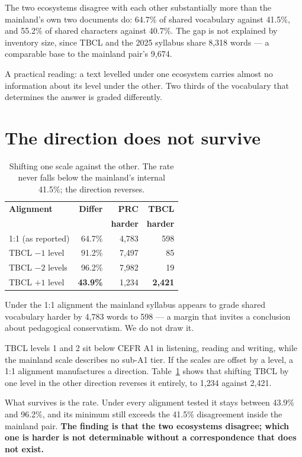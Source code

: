 \documentclass[11pt]{article}
\begin{document}
The two ecosystems disagree with each other substantially more than the
mainland's own two documents do: 64.7\% of shared vocabulary against 41.5\%,
and 55.2\% of shared characters against 40.7\%. The gap is not explained by
inventory size, since TBCL and the 2025 syllabus share 8{,}318 words --- a
comparable base to the mainland pair's 9{,}674.

A practical reading: a text levelled under one ecosystem carries almost no
information about its level under the other. Two thirds of the vocabulary that
determines the answer is graded differently.

\section{The direction does not survive}
\label{sec:direction}

\begin{table}[t]
\centering\small
\begin{tabular}{@{}lrrr@{}}
\toprule
\textbf{Alignment} & \textbf{Differ} & \textbf{PRC} & \textbf{TBCL} \\
 & & \textbf{harder} & \textbf{harder} \\
\midrule
1:1 (as reported) & 64.7\% & 4{,}783 & 598 \\
TBCL $-1$ level   & 91.2\% & 7{,}497 & 85 \\
TBCL $-2$ levels  & 96.2\% & 7{,}982 & 19 \\
TBCL $+1$ level   & \textbf{43.9\%} & 1{,}234 & \textbf{2{,}421} \\
\bottomrule
\end{tabular}
\caption{Shifting one scale against the other. The rate never falls below the
mainland's internal 41.5\%; the direction reverses.}
\label{tab:sensitivity}
\end{table}

Under the 1:1 alignment the mainland syllabus appears to grade shared
vocabulary harder by 4{,}783 words to 598 --- a margin that invites a
conclusion about pedagogical conservatism. We do not draw it.

TBCL levels 1 and 2 sit below CEFR A1 in listening, reading and writing, while
the mainland scale describes no sub-A1 tier. If the scales are offset by a
level, a 1:1 alignment manufactures a direction. Table~\ref{tab:sensitivity}
shows that shifting TBCL by one level in the other direction reverses it
entirely, to 1{,}234 against 2{,}421.

What survives is the rate. Under every alignment tested it stays between 43.9\%
and 96.2\%, and its minimum still exceeds the 41.5\% disagreement inside the
mainland pair. \textbf{The finding is that the two ecosystems disagree; which
one is harder is not determinable without a correspondence that does not
exist.}
\end{document}
